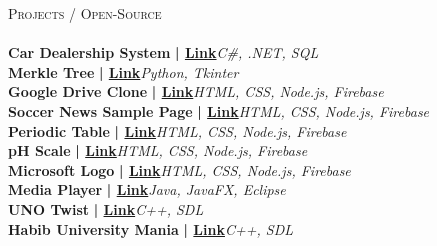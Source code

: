 \documentclass[a4paper]{article}
\newcommand{\lineunder} {
    \vspace*{-8pt} \\
    \hspace*{-18pt} \hrulefill \\
}
\newcommand{\header} [1] {
    {\hspace*{-18pt}\vspace*{6pt} \textsc{#1}}
    \vspace*{-6pt} \lineunder
}
\begin{document}
      \header{Projects / Open-Source}
      \vspace{2mm}
      {\textbf{Car Dealership System}}\textbf{ | \href{https://github.com/rohanraaj2/Car-Dealership-System}{Link}}\hfill{\sl C\#, .NET, SQL}\\

\vspace*{3mm}
      {\textbf{Merkle Tree}}\textbf{ | \href{https://github.com/rohanraaj2/Merkle-Tree}{Link}}\hfill{\sl Python, Tkinter}\\

\vspace*{3mm}
      {\textbf{Google Drive Clone}}\textbf{ | \href{https://drive-clone-29079.web.app/}{Link}}\hfill{\sl HTML, CSS, Node.js, Firebase}\\

\vspace*{3mm}
      {\textbf{Soccer News Sample Page}}\textbf{ | \href{https://soccer-page-eaa38.web.app/}{Link}}\hfill{\sl HTML, CSS, Node.js, Firebase}\\

\vspace*{3mm}
      {\textbf{Periodic Table}}\textbf{ | \href{https://periodic-table-ecf7e.web.app/}{Link}}\hfill{\sl HTML, CSS, Node.js, Firebase}\\

\vspace*{3mm}
      {\textbf{pH Scale}}\textbf{ | \href{https://ph-scale-577b5.web.app/}{Link}}\hfill{\sl HTML, CSS, Node.js, Firebase}\\

\vspace*{3mm}
      {\textbf{Microsoft Logo}}\textbf{ | \href{https://logo-4cef4-51095.web.app/}{Link}}\hfill{\sl HTML, CSS, Node.js, Firebase}\\

\vspace*{3mm}
      {\textbf{Media Player}}\textbf{ | \href{https://github.com/rohanraaj2/Programming-2}{Link}}\hfill{\sl Java, JavaFX, Eclipse}\\

\vspace*{3mm}
      {\textbf{UNO Twist}}\textbf{ | \href{https://github.com/rohanraaj2/UNO-Twist}{Link}}\hfill{\sl C++, SDL}\\

\vspace*{3mm}
      {\textbf{Habib University Mania}}\textbf{ | \href{https://github.com/rohanraaj2/HU-Mania}{Link}}\hfill{\sl C++, SDL}\\
\end{document}
